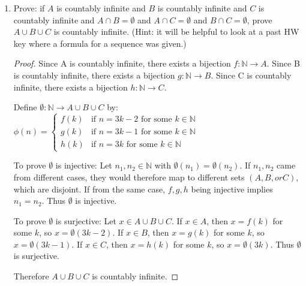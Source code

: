 \documentclass{article}
\begin{document}
\begin{enumerate}
          \newpage

    \item Prove: if $A$ is countably infinite and $B$ is countably infinite and $C$ is
          countably infinite and $A \cap B = \emptyset$ and $A \cap C= \emptyset$ and $B
              \cap C = \emptyset$, prove $A \cup B \cup C$ is countably infinite. (Hint: it
          will be helpful to look at a past HW key where a formula for a sequence was
          given.)

          \begin{proof}
              Since A is countably infinite, there exists a bijection $f: \mathbb{N} \rightarrow A$.
              Since B is countably infinite, there exists a bijection $g: \mathbb{N} \rightarrow B$.
              Since C is countably infinite, there exists a bijection $h: \mathbb{N} \rightarrow C$.

              Define $\emptyset: \mathbb{N} \rightarrow A \cup B \cup C$ by: $\phi(n) = \begin{cases}
                      f(k) & \text{if } n = 3k-2 \text{ for some } k \in \mathbb{N} \\
                      g(k) & \text{if } n = 3k-1 \text{ for some } k \in \mathbb{N} \\
                      h(k) & \text{if } n = 3k \text{ for some } k \in \mathbb{N}
                  \end{cases}$

              To prove $\emptyset$ is injective: Let $n_1, n_2 \in \mathbb{N}$ with
              $\emptyset(n_1) = \emptyset(n_2)$. If $n_1, n_2$ came from different cases,
              they would therefore map to different sets $(A, B, or C)$, which are disjoint.
              If from the same case, $f, g, h$ being injective implies $n_1 = n_2$. Thus
              $\emptyset$ is injective.

              To prove $\emptyset$ is surjective: Let $x \in A \cup B \cup C$. If $x \in A$,
              then $x = f(k)$ for some $k$, so $x = \emptyset(3k-2)$. If $x \in B$, then $x =
                  g(k)$ for some $k$, so $x = \emptyset(3k-1)$. If $x \in C$, then $x = h(k)$ for
              some $k$, so $x = \emptyset(3k)$. Thus $\emptyset$ is surjective.

              Therefore $A \cup B \cup C$ is countably infinite.
          \end{proof}

\end{enumerate}
\end{document}

